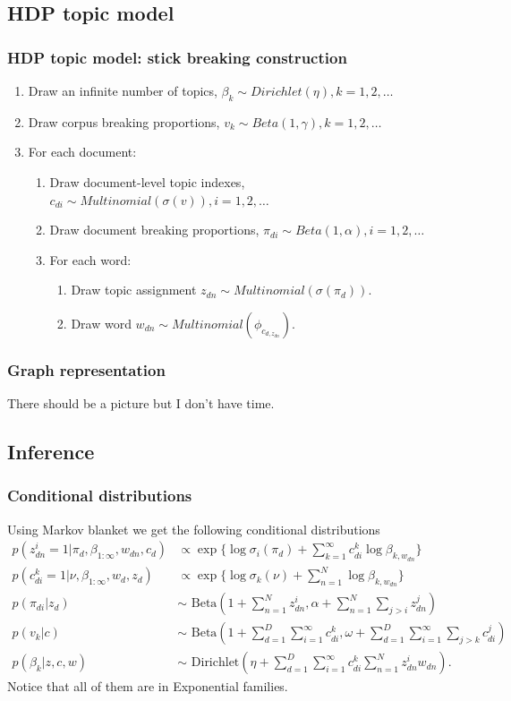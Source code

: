\documentclass{beamer}
\begin{document}
\subsection{HDP topic model}
\begin{frame}
\frametitle{HDP topic model: stick breaking construction}
\begin{enumerate}
	\item Draw an infinite number of topics, $\beta_k\sim Dirichlet(\eta), k = 1, 2, \dots$
	\item Draw corpus breaking proportions, $v_k\sim Beta(1, \gamma), k=1, 2, \dots$
	\item For each document:
	\begin{enumerate}
		\item Draw document-level topic indexes, $c_{di}\sim Multinomial(\sigma(v)), i = 1, 2, \dots$
		\item Draw document breaking proportions, $\pi_{di}\sim Beta(1, \alpha), i = 1, 2, \dots$
		\item For each word:
		\begin{enumerate}
			\item Draw topic assignment $z_{dn}\sim Multinomial(\sigma(\pi_d))$.
			\item Draw word $w_{dn}\sim Multinomial(\phi_{c_{d, z_{dn}}})$.
		\end{enumerate}
	\end{enumerate}
\end{enumerate}
\end{frame}

\begin{frame}
\frametitle{Graph representation}
There should be a picture but I don't have time.
\end{frame}

\subsection{Inference}
\begin{frame}
\frametitle{Conditional distributions}
Using Markov blanket we get the following conditional distributions
\begin{align*}
p(z_{dn}^i=1|\pi_d, \beta_{1:\infty},w_{dn},c_d) & \propto \exp\{\log\sigma_i(\pi_d)+\sum\limits_{k=1}^{\infty}c_{di}^k\log\beta_{k,w_{dn}}\}\\
p(c_{di}^k=1|\nu, \beta_{1:\infty},w_d, z_d) & \propto \exp\{\log\sigma_k(\nu)+\sum\limits_{n=1}^{N}\log\beta_{k,w_{dn}}\}\\
p(\pi_{di}|z_d) & \sim \text{ Beta}(1+\sum\limits_{n=1}^{N}z_{dn}^i, \alpha+\sum\limits_{n=1}^{N}\sum_{j>i}z_{dn}^j)\\
p(v_k|c) & \sim \text{ Beta}(1+\sum\limits_{d=1}^{D}\sum\limits_{i=1}^{\infty}c_{di}^k, \omega+\sum\limits_{d=1}^{D}\sum\limits_{i=1}^{\infty}\sum_{j>k}c_{di}^j)\\
p(\beta_k|z,c,w) & \sim \text{ Dirichlet}(\eta+\sum\limits_{d=1}^{D}\sum\limits_{i=1}^{\infty}c_{di}^k\sum\limits_{n=1}^{N}z_{dn}^iw_{dn}).
\end{align*}
Notice that all of them are in Exponential families.
\end{frame}
\end{document}

